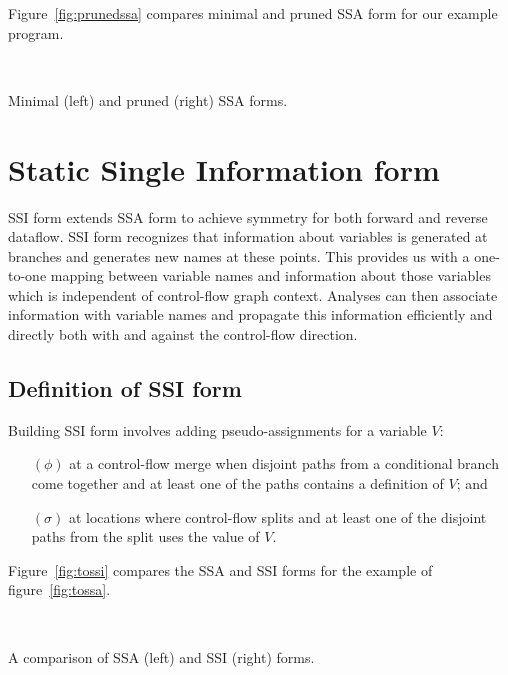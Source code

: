 \documentclass[12pt,titlepage,twoside]{article}
\let\oldsection\section
\renewcommand{\section}{\setcounter{figure}{0}\setcounter{table}{0}\oldsection}
\begin{document}
Figure~\vref{fig:prunedssa} compares minimal and pruned SSA form for
our example program.
\begin{myfigure}
\begin{center}
 \vline\ 
\end{center}
\caption[Minimal and pruned SSA forms.]
{Minimal (left) and pruned (right) SSA forms.}
\label{fig:prunedssa}
\end{myfigure}

\section{Static Single Information form}\label{sec:ssi}

SSI form extends SSA form to achieve symmetry for both forward and
reverse dataflow.   SSI form recognizes that information about
variables is generated at branches and generates new names at these
points.  This provides us with a one-to-one mapping between variable
names and information about those variables which is independent of
control-flow graph context.  Analyses can then associate information
with variable names and propagate this information efficiently and
directly both with and against the control-flow direction.

\subsection{Definition of SSI form}
Building SSI form involves adding pseudo-assignments for a variable $V$:
\begin{enumerate}
\item[$(\phi)$] at a control-flow merge when disjoint paths from a
conditional branch come together and at least one of the paths
contains a definition of $V$; and
\item[$(\sigma)$] at locations where control-flow splits and at least
one of the disjoint paths from the split uses the value of $V$.
\end{enumerate}

Figure~\vref{fig:tossi} compares the SSA and SSI forms for 
the example of figure~\ref{fig:tossa}.%
\begin{myfigure}
\begin{center}
 \vline\ 
\end{center}
\caption[A comparison of SSA and SSI forms.]
{A comparison of SSA (left) and SSI (right) forms.}
\label{fig:tossi}
\end{myfigure}
\end{document}
